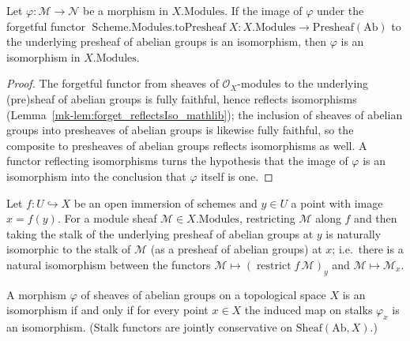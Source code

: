 \begin{lemma}\label{mk-lem:isIso_modules_of_toPresheaf}
  \leanok

  Let \(\varphi : \mathcal{M} \to \mathcal{N}\) be a morphism in \(X.\mathrm{Modules}\). If the
  image of \(\varphi\) under the forgetful functor
  \(\operatorname{Scheme.Modules.toPresheaf} X : X.\mathrm{Modules} \to \mathrm{Presheaf}(\mathrm{Ab})\)
  to the underlying presheaf of abelian groups is an isomorphism, then \(\varphi\) is an
  isomorphism in \(X.\mathrm{Modules}\).
\end{lemma}
\begin{proof}
  The forgetful functor from sheaves of \(\mathcal{O}_X\)-modules to the underlying (pre)sheaf of
  abelian groups is fully faithful, hence reflects isomorphisms
  (Lemma~\ref{mk-lem:forget_reflectsIso_mathlib}); the inclusion of sheaves of abelian groups into
  presheaves of abelian groups is likewise fully faithful, so the composite to presheaves of abelian
  groups reflects isomorphisms as well. A functor reflecting isomorphisms turns the hypothesis that
  the image of \(\varphi\) is an isomorphism into the conclusion that \(\varphi\) itself is one.
\end{proof}

\begin{lemma}
  \label{mk-lem:restrictStalkNatIso_mathlib}
  \mathlibok

  Let \(f : U \hookrightarrow X\) be an open immersion of schemes and \(y \in U\) a point with
  image \(x = f(y)\). For a module sheaf \(\mathcal{M} \in X.\mathrm{Modules}\), restricting
  \(\mathcal{M}\) along \(f\) and then taking the stalk of the underlying presheaf of abelian
  groups at \(y\) is naturally isomorphic to the stalk of \(\mathcal{M}\) (as a presheaf of
  abelian groups) at \(x\); i.e.\ there is a natural isomorphism between the functors
  \(\mathcal{M} \mapsto (\operatorname{restrict} f\,\mathcal{M})_y\) and \(\mathcal{M} \mapsto
  \mathcal{M}_x\).
\end{lemma}

\begin{lemma}
  \label{mk-lem:isIso_iff_stalkFunctor_map_iso_mathlib}
  \mathlibok

  A morphism \(\varphi\) of sheaves of abelian groups on a topological space \(X\) is an
  isomorphism if and only if for every point \(x \in X\) the induced map on stalks
  \(\varphi_x\) is an isomorphism. (Stalk functors are jointly conservative on
  \(\mathrm{Sheaf}(\mathrm{Ab}, X)\).)
\end{lemma}

